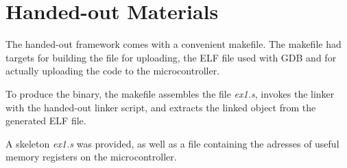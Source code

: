 \section{Handed-out Materials}
The handed-out framework comes with a convenient makefile.
The makefile had targets for building the file for uploading, the ELF file used with GDB and for actually uploading the code to the microcontroller.

To produce the binary, the makefile assembles the file \emph{ex1.s}, invokes the linker with the handed-out linker script, and extracts the linked object from the generated ELF file.

A skeleton \emph{ex1.s} was provided, as well as a file containing the adresses of useful memory registers on the microcontroller.
